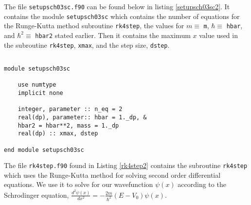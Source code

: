 \documentclass[12pt]{article}
\begin{document}
The file {\tt setupsch03sc.f90} can be found below in listing \ref{setupsch03sc2}.  It contains the module {\tt setupsch03sc} which contains the number of equations for the Runge-Kutta method subroutine {\tt rk4step}, the values for $m\equiv$ {\tt m}, $\hbar\equiv$ {\tt hbar}, and $\hbar^2\equiv$ {\tt hbar2} stated earlier.  Then it contains the maximum $x$ value used in the subroutine {\tt rk4step}, {\tt xmax}, and the step size, {\tt dstep}.  

\begin{lstlisting}[frame=single,caption={{\tt sch03sc.f90}},label=setupsch03sc2]

module setupsch03sc

    use numtype
	implicit none

	integer, parameter :: n_eq = 2
	real(dp), parameter:: hbar = 1._dp, & 
	hbar2 = hbar**2, mass = 1._dp
    real(dp) :: xmax, dstep

end module setupsch03sc

\end{lstlisting}

The file {\tt rk4step.f90} found in Listing \ref{rk4step2} contains the subroutine {\tt rk4step} which uses the Runge-Kutta method for solving second order differential equations.  We use it to solve for our wavefunction $\psi(x)$ according to the Schrodinger equation, $\frac{d^2\psi(x)}{dx^2}=-\frac{2m}{\hbar^2}(E-V_0)\psi(x)$. 
\end{document}

